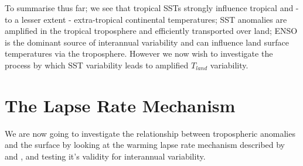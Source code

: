 To summarise thus far; we see that tropical SSTs strongly influence tropical and 
- to a lesser extent - extra-tropical continental temperatures; SST anomalies 
are amplified in the tropical troposphere and efficiently transported over land; 
ENSO is the dominant source of interannual variability and can influence land 
surface temperatures via the troposphere. However we now wish to investigate the 
process by which SST variability leads to amplified $T_{land}$ variability.  




\section{The Lapse Rate Mechanism}

We are now going to investigate the relationship between tropospheric anomalies 
and the surface by looking at the warming lapse rate mechanism described by 
\citet{Joshi2007} and \citet{Byrne2013a}, and testing it's validity for 
interannual variability. 

